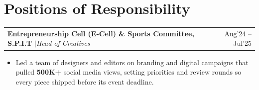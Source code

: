 \documentclass[a4paper,10pt]{article}
\makeatletter
\newcommand{\sep}{\unskip\hspace{0.5em}$|$\hspace{0.5em}\ignorespaces}
\newcommand{\entry}[2]{%
  \begin{tabularx}{\linewidth}{@{}Xr@{}}#1 & #2\end{tabularx}\par}
\makeatother
\begin{document}

\section*{Positions of Responsibility}

\entry{\textbf{Entrepreneurship Cell (E-Cell) \& Sports Committee, S.P.I.T} \sep \textit{Head of Creatives}}{Aug'24 -- Jul'25}
\begin{itemize}
    \item Led a team of designers and editors on branding and digital campaigns that pulled \textbf{500K+} social media views, setting priorities and review rounds so every piece shipped before its event deadline.
\end{itemize}
\end{document}
